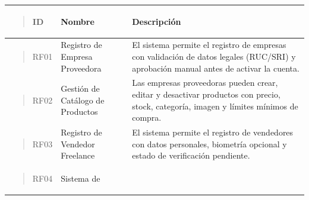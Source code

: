 \documentclass[
]{article}
\newcounter{none} %
\begin{document}
{\def\LTcaptype{none} %
\begin{longtable}[]{@{}
  >{\raggedright\arraybackslash}p{}
  >{\raggedright\arraybackslash}p{}
  >{\raggedright\arraybackslash}p{}@{}}
\toprule\noalign{}
\begin{minipage}[b]{\linewidth}\raggedright
\begin{quote}
ID
\end{quote}
\end{minipage} & \begin{minipage}[b]{\linewidth}\raggedright
Nombre
\end{minipage} & \begin{minipage}[b]{\linewidth}\raggedright
Descripción
\end{minipage} \\
\midrule\noalign{}
\endhead
\bottomrule\noalign{}
\endlastfoot
\begin{minipage}[t]{\linewidth}\raggedright
\begin{quote}
RF01
\end{quote}
\end{minipage} & Registro de Empresa Proveedora & El sistema permite el
registro de empresas con validación de datos legales (RUC/SRI) y
aprobación manual antes de activar la cuenta. \\
\begin{minipage}[t]{\linewidth}\raggedright
\begin{quote}
RF02
\end{quote}
\end{minipage} & Gestión de Catálogo de Productos & Las empresas
proveedoras pueden crear, editar y desactivar productos con precio,
stock, categoría, imagen y límites mínimos de compra. \\
\begin{minipage}[t]{\linewidth}\raggedright
\begin{quote}
RF03
\end{quote}
\end{minipage} & Registro de Vendedor Freelance & El sistema permite el
registro de vendedores con datos personales, biometría opcional y estado
de verificación pendiente. \\
\begin{minipage}[t]{\linewidth}\raggedright
\begin{quote}
RF04
\end{quote}
\end{minipage} & Sistema de


\end{longtable}}
\end{document}

